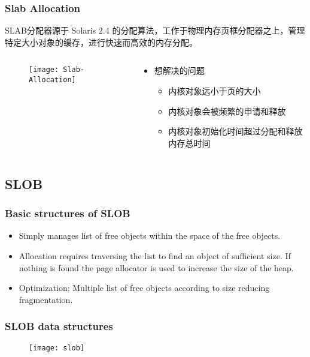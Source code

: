 \begin{frame}[plain,t]    
    \frametitle{Slab Allocation}

    SLAB分配器源于 Solaris 2.4 的分配算法，工作于物理内存页框分配器之上，管理特定大小对象的缓存，进行快速而高效的内存分配。
    \begin{columns}
        \begin{column}{0.5\textwidth}
          \begin{figure}
              \centering
              \texttt{[image: Slab-Allocation]}
          \end{figure}
        \end{column}
        \begin{column}{0.5\textwidth}
          \begin{itemize}
              \item 想解决的问题
              \begin{itemize}
                  \item 内核对象远小于页的大小
                  \item 内核对象会被频繁的申请和释放
                  \item 内核对象初始化时间超过分配和释放内存总时间
              \end{itemize}
          \end{itemize}
        \end{column}
    \end{columns}
\end{frame}
\subsection{SLOB} %
\begin{frame}[plain,t]    
    \frametitle{Basic structures of SLOB}
    \begin{itemize}
        \item Simply manages list of free objects within the space of the free objects.
        \item Allocation requires traversing the list to find an object of sufficient size. If nothing is found the page allocator is used to increase the size of the heap.
        \item Optimization: Multiple list of free objects according to size reducing fragmentation.
    \end{itemize}
\end{frame}
\begin{frame}[plain,t]    
    \frametitle{SLOB data structures}
    \begin{figure}
        \centering
        \texttt{[image: slob]}
    \end{figure}

\end{frame}
